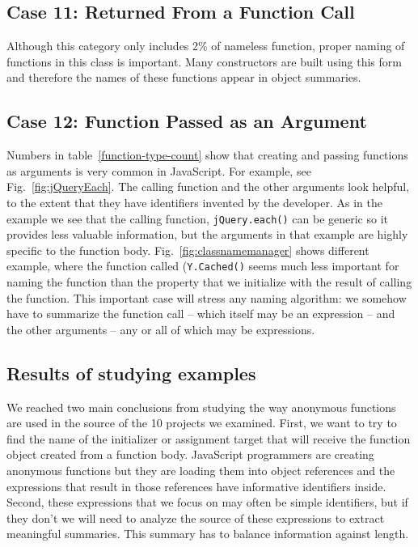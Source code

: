 \documentclass[10pt, preprint]{sigplanconf}
\begin{document}
\subsection{Case 11:  Returned From a Function Call}

Although this category only includes 2\% of nameless function, proper naming of functions in this class is important. Many constructors are built using this form and therefore the names of these functions appear in object summaries.

\subsection{Case 12: Function Passed as an Argument}
Numbers in table~\ref{function-type-count} show that creating and passing functions as arguments is very common in JavaScript.
For example, see Fig.~\ref{fig:jQueryEach}. The calling function and the other arguments look helpful, to the extent that they have identifiers invented by the developer. As in the example we see that the calling function, \verb|jQuery.each()| can be generic so it provides less valuable information, but the arguments in that example are highly specific to the function body.  Fig.~\ref{fig:classnamemanager} shows different example, where the function called (\verb|Y.Cached()| seems much less important for naming the function than the property that we initialize with the result of calling the function.
This important case will stress any naming algorithm: we somehow have to summarize the function call -- which itself may be an expression -- and the other arguments -- any or all of which may be expressions. 

\subsection{Results of studying examples}
We reached two main conclusions from studying the way anonymous functions are used in the source of the 10 projects we examined. First, we want to try to find the name of the initializer or assignment target that will receive the function object created from a function body.  JavaScript programmers are creating anonymous functions but they are loading them into object references and the expressions that result in those references have informative identifiers inside. Second, these expressions that we focus on may often be simple identifiers, but if they don't we will need to analyze the source of these expressions to extract meaningful summaries. This summary has to balance information against length.
\end{document}
